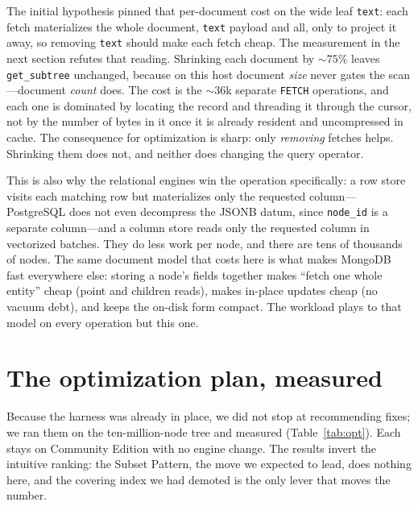 \documentclass[11pt]{article}
\newcommand{\code}[1]{\texttt{#1}}
\begin{document}
The initial hypothesis pinned that per-document cost on the wide leaf
\code{text}: each fetch materializes the whole document, \code{text} payload and
all, only to project it away, so removing \code{text} should make each fetch
cheap. The measurement in the next section refutes that reading. Shrinking each
document by ${\sim}75\%$ leaves \code{get\_subtree} unchanged, because on this host
document \emph{size} never gates the scan---document \emph{count} does. The cost
is the ${\sim}36$k separate \code{FETCH} operations, and each one is dominated by
locating the record and threading it through the cursor, not by the number of
bytes in it once it is already resident and uncompressed in cache. The
consequence for optimization is sharp: only \emph{removing} fetches helps.
Shrinking them does not, and neither does changing the query operator.

This is also why the relational engines win the operation specifically: a row
store visits each matching row but materializes only the requested
column---PostgreSQL does not even decompress the JSONB datum, since
\code{node\_id} is a separate column---and a column store reads only the requested
column in vectorized batches. They do less work per node, and there are tens of
thousands of nodes. The same document model that costs here is what makes MongoDB
fast everywhere else: storing a node's fields together makes ``fetch one whole
entity'' cheap (point and children reads), makes in-place updates cheap (no vacuum
debt), and keeps the on-disk form compact. The workload plays to that model on
every operation but this one.

\section{The optimization plan, measured}\label{sec:plan}

Because the harness was already in place, we did not stop at recommending fixes;
we ran them on the ten-million-node tree and measured (Table~\ref{tab:opt}). Each
stays on Community Edition with no engine change. The results invert the intuitive
ranking: the Subset Pattern, the move we expected to lead, does nothing here, and
the covering index we had demoted is the only lever that moves the number.
\end{document}
